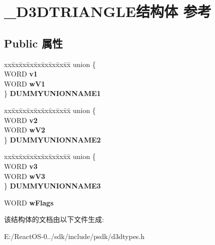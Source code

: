 \hypertarget{struct___d3_d_t_r_i_a_n_g_l_e}{}\section{\+\_\+\+D3\+D\+T\+R\+I\+A\+N\+G\+L\+E结构体 参考}
\label{struct___d3_d_t_r_i_a_n_g_l_e}
\subsection*{Public 属性}
\begin{DoxyCompactItemize}
\item 
\mbox{\label{struct___d3_d_t_r_i_a_n_g_l_e_aa3c300228f90e124974d50334a980907}} 
\begin{tabbing}
xx\=xx\=xx\=xx\=xx\=xx\=xx\=xx\=xx\=\kill
union \{\\
\>WORD {\bfseries v1}\\
\>WORD {\bfseries wV1}\\
\} {\bfseries DUMMYUNIONNAME1}\\

\end{tabbing}\item 
\mbox{\label{struct___d3_d_t_r_i_a_n_g_l_e_a92e6015088a99be9b52c858b3a43779e}} 
\begin{tabbing}
xx\=xx\=xx\=xx\=xx\=xx\=xx\=xx\=xx\=\kill
union \{\\
\>WORD {\bfseries v2}\\
\>WORD {\bfseries wV2}\\
\} {\bfseries DUMMYUNIONNAME2}\\

\end{tabbing}\item 
\mbox{\label{struct___d3_d_t_r_i_a_n_g_l_e_a157636fa24f53cd863f8518c76307f78}} 
\begin{tabbing}
xx\=xx\=xx\=xx\=xx\=xx\=xx\=xx\=xx\=\kill
union \{\\
\>WORD {\bfseries v3}\\
\>WORD {\bfseries wV3}\\
\} {\bfseries DUMMYUNIONNAME3}\\

\end{tabbing}\item 
\mbox{\label{struct___d3_d_t_r_i_a_n_g_l_e_a65e8c8f5965d665f3281a2c89189e5b8}} 
W\+O\+RD {\bfseries w\+Flags}
\end{DoxyCompactItemize}


该结构体的文档由以下文件生成\+:\begin{DoxyCompactItemize}
\item 
E\+:/\+React\+O\+S-\/0../sdk/include/psdk/d3dtypes.\+h\end{DoxyCompactItemize}
